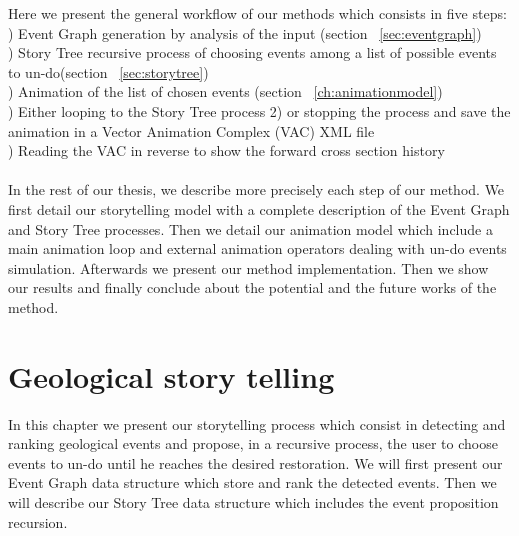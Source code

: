\documentclass[12pt, a4paper]{report} %
\begin{document}
Here we present the general workflow  of our methods which consists in five steps:\\

) Event Graph generation by analysis of the input (section ~\ref{sec:eventgraph})\\
) Story Tree recursive process of choosing events among a list of possible events to un-do(section ~\ref{sec:storytree})\\
) Animation of the list of chosen events (section ~\ref{ch:animationmodel})\\
) Either looping to the Story Tree process 2) or stopping the process and save the animation in a Vector Animation Complex (VAC) XML file\cite{vac} \\
) Reading the VAC in reverse to show the forward cross section history
\\\\
In the rest of our thesis, we describe more precisely each step of our method. We first detail our storytelling model with a complete description of the Event Graph and Story Tree processes. Then we detail our animation model  which include a main animation loop and external animation operators dealing with un-do events simulation. Afterwards we present our method implementation. Then we show our results and finally conclude about the potential and the future works of the method. 

\chapter{Geological story telling}

In this chapter we present our storytelling process which consist in detecting and ranking geological events and propose, in a recursive process, the user to choose events to un-do until he reaches the desired restoration.
We will first present our Event Graph data structure which store and rank the detected events. Then we will describe our Story Tree data structure which includes the event proposition recursion.
\end{document}
